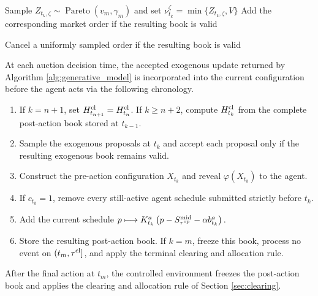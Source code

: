 \documentclass[11pt]{article}
\begin{document}
\begin{algorithm}[ht!]
\begin{algorithmic}[1]
    \FOR{$\zeta\in\{+,-\}$}
            \STATE Sample $Z_{t_k,\zeta}
            \sim
            \operatorname{Pareto}(v_m,\gamma_m)$ and set $\nu_{t_k}^{\zeta}
            =
            \min\{Z_{t_k,\zeta},V\}$
            \STATE Add the corresponding market order if the resulting book is valid
        \ENDIF

            \STATE Cancel a uniformly sampled order if the resulting book is valid
        \ENDIF
    \ENDFOR
\ENDFOR
\end{algorithmic}
\end{algorithm}

At each auction decision time, the accepted exogenous update returned by Algorithm \ref{alg:generative_model} is incorporated into the current configuration before the agent acts via the following chronology.
\begin{enumerate}
    \item If $k=n+1$, set
    $H_{t_{n+1}}^{\mathrm{cl}}=H_{t_n}^{\mathrm{cl}}$. If $k\geqslant n+2$, compute
    $H_{t_k}^{\mathrm{cl}}$ from the complete post-action book stored at
    $t_{k-1}$.
    \item Sample the exogenous proposals at $t_k$ and accept each
    proposal only if the resulting exogenous book remains valid.
    \item Construct the pre-action configuration $X_{t_k}$ and reveal
    $\varphi(X_{t_k})$ to the agent.
    \item If $c_{t_k}=1$, remove every still-active agent schedule
    submitted strictly before $t_k$.
    \item Add the current schedule $p\longmapsto
    K_{t_k}^a
    \left(
    p-S_{\tau^{\mathrm{op}}}^{\mathrm{mid}}-\alpha b_{t_k}^a
    \right).$
    \item Store the resulting post-action book. If $k=m$, freeze this
    book, process no event on $(t_m,\tau^{\mathrm{cl}}]$, and apply the terminal
    clearing and allocation rule.
\end{enumerate}
After the final action at $t_m$, the controlled environment freezes the post-action book and applies the clearing and allocation rule of Section \ref{sec:clearing}.\vspace{0.5em}
\end{document}
